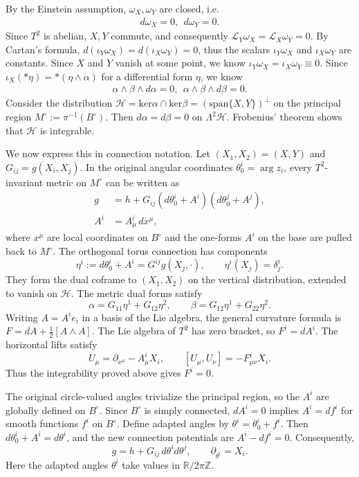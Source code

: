 \documentclass[letterpaper]{amsart}
\theoremstyle{definition}
\theoremstyle{remark}
\begin{document}
By the Einstein assumption, $\omega _{X}, \omega _{Y} $ are closed, i.e.
\begin{align*}
	d \omega _X =0, \ \ d \omega _{Y} =0.
\end{align*} 
Since $T^2$ is abelian, $X, Y$ commute, and consequently $\mathcal{L}_{Y} \omega _X = \mathcal{L}_{X} \omega _{Y} =0$. By Cartan's formula, $d (\iota _{Y} \omega _X) = d (\iota _{X} \omega _Y)=0$, thus the scalars $\iota _{Y} \omega _X$ and $\iota _{X} \omega _Y$ are constants. Since $X$ and $Y$ vanish at some point, we know $\iota _{Y} \omega _X = \iota _{X} \omega _Y \equiv 0$. Since $\iota _{X} ( * \eta ) = * ( \eta \wedge \alpha )$ for a differential form $\eta$, we know
\begin{align*}
	\alpha \wedge \beta \wedge d \alpha =0,\ \ \alpha \wedge \beta \wedge d \beta =0.
\end{align*} 
Consider the distribution $\mathcal{H} = \mathrm{ker} \alpha \cap \mathrm{ker} \beta = ( \mathrm{span} \{X, Y\} ) ^{\perp}$ on the principal region $M^{\circ}:=\pi^{-1}(B^{\circ})$. Then $d \alpha = d \beta =0 $ on $\Lambda ^2 \mathcal{H}$. Frobenius' theorem shows that $\mathcal{H}$ is integrable. 

We now express this in connection notation. Let $(X_1,X_2)=(X,Y)$ and $G_{ij}=g(X_i,X_j)$. In the original angular coordinates $\theta_0^i=\arg z_i$, every $T^2$-invariant metric on $M^\circ$ can be written as
\begin{align*}
g &= h+G_{ij}(d\theta_0^i+A^i)(d\theta_0^j+A^j),\\
A^i &= A^i_\mu\,dx^\mu ,
\end{align*}
where $x^\mu$ are local coordinates on $B^\circ$ and the one-forms $A^i$ on the base are pulled back to $M^\circ$. The orthogonal torus connection has components
\[
\eta^i:=d\theta_0^i+A^i=G^{ij}g(X_j,\cdot),
\qquad \eta^i(X_j)=\delta^i_j.
\]
They form the dual coframe to $(X_1,X_2)$ on the vertical distribution, extended to vanish on $\mathcal H$. The metric dual forms satisfy
\[
\alpha=G_{11}\eta^1+G_{12}\eta^2,\qquad
\beta=G_{12}\eta^1+G_{22}\eta^2.
\]
Writing $A=A^i e_i$ in a basis of the Lie algebra, the general curvature formula is $F=dA+\tfrac12[A\wedge A]$. The Lie algebra of $T^2$ has zero bracket, so $F^i=dA^i$. The horizontal lifts satisfy
\[
U_\mu=\partial_{x^\mu}-A^i_\mu X_i,
\qquad
[U_\mu,U_\nu]=-F^i_{\mu\nu}X_i.
\]
Thus the integrability proved above gives $F^i=0$.

The original circle-valued angles trivialize the principal region, so the $A^i$ are globally defined on $B^\circ$. Since $B^\circ$ is simply connected, $dA^i=0$ implies $A^i=df^i$ for smooth functions $f^i$ on $B^\circ$. Define adapted angles by $\theta^i=\theta_0^i+f^i$. Then $d\theta_0^i+A^i=d\theta^i$, and the new connection potentials are $A^i-df^i=0$. Consequently,
\[
g=h+G_{ij}\,d\theta^i d\theta^j,
\qquad
\partial_{\theta^i}=X_i.
\]
Here the adapted angles $\theta^i$ take values in $\mathbb R/2\pi\mathbb Z$.
\end{document}
